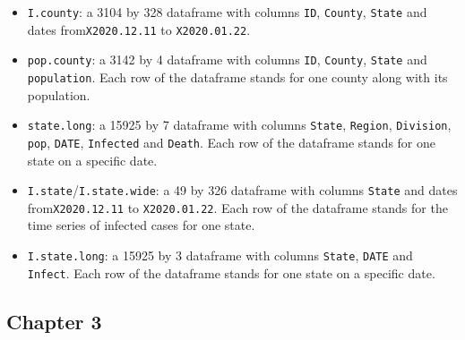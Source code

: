 \documentclass[]{book}
\begin{document}
\begin{itemize}
\item
  \texttt{I.county}: a 3104 by 328 dataframe with columns \texttt{ID},
  \texttt{County}, \texttt{State} and dates from\texttt{X2020.12.11} to
  \texttt{X2020.01.22}.
\item
  \texttt{pop.county}: a 3142 by 4 dataframe with columns \texttt{ID},
  \texttt{County}, \texttt{State} and \texttt{population}. Each row of
  the dataframe stands for one county along with its population.
\item
  \texttt{state.long}: a 15925 by 7 dataframe with columns
  \texttt{State}, \texttt{Region}, \texttt{Division}, \texttt{pop},
  \texttt{DATE}, \texttt{Infected} and \texttt{Death}. Each row of the
  dataframe stands for one state on a specific date.
\item
  \texttt{I.state}/\texttt{I.state.wide}: a 49 by 326 dataframe with
  columns \texttt{State} and dates from\texttt{X2020.12.11} to
  \texttt{X2020.01.22}. Each row of the dataframe stands for the time
  series of infected cases for one state.
\item
  \texttt{I.state.long}: a 15925 by 3 dataframe with columns
  \texttt{State}, \texttt{DATE} and \texttt{Infect}. Each row of the
  dataframe stands for one state on a specific date.
\end{itemize}

\subsection{Chapter 3}\label{chapter-3}


\end{document}
